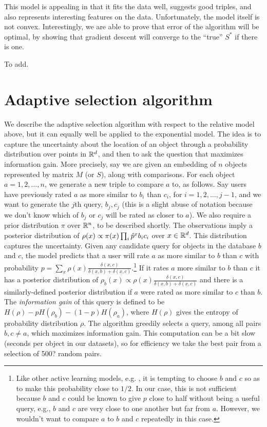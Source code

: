 \documentclass{article}
\begin{document}
This model is appealing in that it fits the data well, suggests good triples, and also represents interesting features on the data.  Unfortunately, the model itself is not convex.  Interestingly, we are able to prove that error of the algorithm will be optimal, by showing that gradient descent will converge to the ``true'' $S^*$ if there is one.
\begin{theorem}
To add.
\end{theorem}


\section{Adaptive selection algorithm}

We describe the adaptive selection algorithm with respect to the relative model above, but it can equally well be applied to the exponential model.  The idea is to capture the uncertainty about the location of an object through a probability distribution over points in $\mathbb{R}^d$, and then to ask the question that maximizes information gain.  More precisely, say we are given an embedding of $n$ objects represented by matrix $M$ (or $S$), along with comparisons.  For each object $a=1,2,\ldots,n$, we generate a new triple to compare $a$ to, as follows.  Say users have previously rated $a$ as more similar to $b_i$ than $c_i$, for $i=1,2,\ldots,j-1$, and we want to generate the $j$th query, $b_j,c_j$ (this is a slight abuse of notation because we don't know which of $b_j$ or $c_j$ will be rated as closer to $a$).  We also require a prior distribution $\pi$ over $\mathbb{R}^n$, to be described shortly.  The observations imply a posterior distribution of $\rho(x) \propto \pi(x) \prod_i \hat{p}^{x}{b_ic_i}$ over $x \in \mathbb{R}^d$.  This distribution captures the uncertainty.  Given any candidate query for objects in the database $b$ and $c$, the model predicts that a user will rate $a$ as more similar to $b$ than $c$ with probability $p=\sum_x \rho(x)\frac{\delta(x,c)}{\delta(x,b)+\delta(x,c)}$.\footnote{Like other active learning models, e.g. \cite{??}, it is tempting to choose $b$ and $c$ so as to make this probability close to $1/2$.  In our case, this is not sufficient because $b$ and $c$ could be known to give $p$ close to half without being a useful query, e.g., $b$ and $c$ are very close to one another but far from $a$.  However, we wouldn't want to compare $a$ to $b$ and $c$ repeatedly in this case.}  If it rates $a$ more similar to $b$ than $c$ it has a posterior distribution of $\rho_b(x) \propto \rho(x)\frac{\delta(x,c)}{\delta(x,b)+\delta(x,c)}$ and there is a similarly-defined posterior distribution if $a$ were rated as more similar to $c$ than $b$.  The {\em information gain} of this query is defined to be $H(\rho)-pH(\rho_b)-(1-p)H(\rho_a)$, where $H(\rho)$ gives the entropy of probability distribution $\rho$.  The algorithm greedily selects a query, among all pairs $b,c \neq a$, which maximizes information gain.  This computation can be a bit slow (seconds per object in our datasets), so for efficiency we take the best pair from a selection of 500? random pairs.
\end{document}
